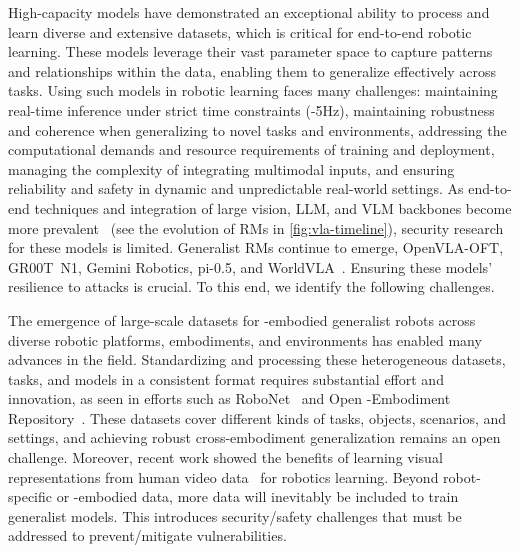 \documentclass[11pt,letterpaper]{article}
\begin{document}
High-capacity models have demonstrated an exceptional ability to process and learn diverse and extensive datasets, which is critical for end-to-end robotic learning. 
These models leverage their vast parameter space to capture patterns and relationships within the data, enabling them to generalize effectively across tasks. 
Using such models in robotic learning faces many challenges: 
 maintaining real-time inference under strict time constraints (-5Hz), 
 maintaining robustness and coherence when generalizing to novel tasks and environments, 
 addressing the computational demands and resource requirements of training and deployment, 
 managing the complexity of integrating multimodal inputs, and 
 ensuring reliability and safety in dynamic and unpredictable real-world settings.
As end-to-end techniques and integration of large vision, LLM, and VLM backbones become more prevalent~\cite{9} (see the evolution of RMs in \autoref{fig:vla-timeline}), security research for these models is limited. Generalist RMs continue to emerge, \eg OpenVLA-OFT, {GR00T}~N1, Gemini Robotics, pi-0.5, and WorldVLA~\cite{qu2025spatialvla,openvla_oft,gr00tn1,geminirobotics2025,pi05_2025,cen2025worldvla,cheang2024gr2}. Ensuring these models' resilience to attacks is crucial.
To this end, we identify the following challenges.


The emergence of large-scale datasets for {\xo}-embodied generalist robots across diverse robotic platforms, embodiments, and environments has enabled many advances in the field.
Standardizing and processing these heterogeneous datasets, tasks, and models in a consistent format requires substantial effort and innovation, as seen in efforts such as RoboNet~\cite{dasari2020robonet} and Open {\xo}-Embodiment Repository~\cite{9}. 
These datasets cover different kinds of tasks, objects, scenarios, and settings, and achieving robust cross-embodiment generalization remains an open challenge.
Moreover, recent work showed the benefits of learning visual representations from human video data~\cite{nair2022r3m,xiao2022masked,radosavovic2022,majumdar2024we,karamcheti2023language,mu2023ec2,bahl2023affordances} for robotics learning. 
Beyond robot-specific or {\xo}-embodied data, more data will inevitably be included to train generalist models.
This introduces security/safety challenges that must be addressed to prevent/mitigate vulnerabilities.
\end{document}

